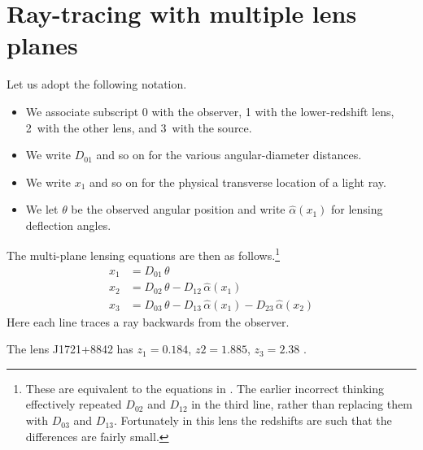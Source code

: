 \documentclass[12pt]{article}
\title{}
\author{The usual suspects}
\date{January 2025}
\begin{document}
\maketitle

\section{Ray-tracing with multiple lens planes}

Let us adopt the following notation.
\begin{itemize}
\item We associate subscript 0 with the observer, 1 with the
  lower-redshift lens, 2~with the other lens, and 3~with the source.
\item We write $D_{01}$ and so on for the various angular-diameter
  distances.
\item We write $x_1$ and so on for the physical transverse location of
  a light ray.
\item We let $\theta$ be the observed angular position and write
  $\hat\alpha(x_1)$ for lensing deflection angles.
\end{itemize}
The multi-plane lensing equations are then as follows.\footnote{These
are equivalent to the equations in \cite{2016MNRAS.456.2210C}. The
earlier incorrect thinking effectively repeated $D_{02}$ and $D_{12}$
in the third line, rather than replacing them with $D_{03}$ and
$D_{13}$.  Fortunately in this lens the redshifts are such that the
differences are fairly small.}
\begin{equation}
\begin{aligned}
  x_1 &= D_{01} \, \theta \\
  x_2 &= D_{02} \, \theta - D_{12} \, \hat\alpha(x_1) \\
  x_3 &= D_{03} \, \theta - D_{13} \, \hat\alpha(x_1)
                          - D_{23} \, \hat\alpha(x_2)
\end{aligned}
\end{equation}
Here each line traces a ray backwards from the observer.



The lens J1721+8842 has $z_1=0.184$, $z2=1.885$, $z_3=2.38$
\citep{2018MNRAS.479.5060L,2024arXiv241104177D}.


\newcommand{\mnras}{MNRAS}



\end{document}
